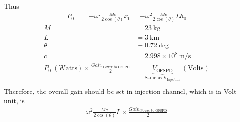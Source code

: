 Thus,
\begin{align}
    P_0 &= -\omega^2 \frac{M c}{2 \cos(\theta)} x_0 = -\omega^2 \frac{M c}{2 \cos(\theta)} L h_0
\end{align}
\begin{align*}
    M &= 23 ~\mathrm{kg} \\
    L &= 3 ~\mathrm{km}  \\
    \theta &= 0.72 ~\mathrm{deg}  \\
    c &= 2.998\times10^8 ~\mathrm{m/s} \\
    P_0 ~(\mathrm{Watts}) \times \frac{Gain_{\text{~Power to OFSPD}}}{2} &= 
     \underbrace{V_{\text{OFSPD}}}_{\text{Same as V$_{\text{Injection}}$}}~ (\mathrm{Volts}) \\
\end{align*}
Therefore, the overall gain should be set in injection channel, which is in Volt unit, is
\begin{align}
    \omega^2 \frac{M c}{2 \cos(\theta)} L \times \frac{Gain_{\text{~Power to OFSPD}} }{2}
\end{align}

